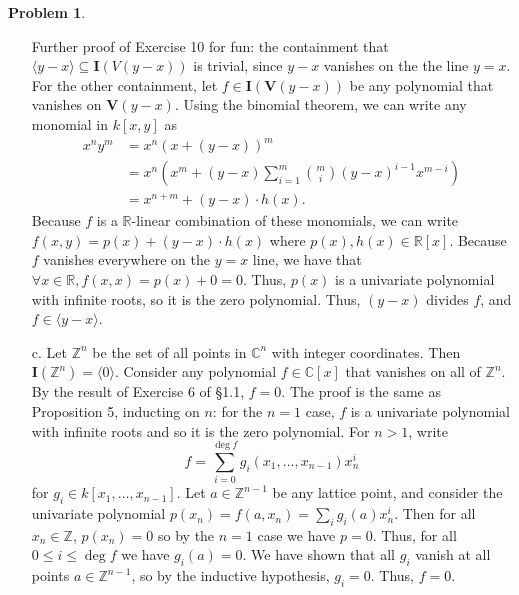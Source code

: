 \documentclass[12pt]{amsart}
\theoremstyle{definition}
\newtheorem{prob}{Problem}
\begin{document}
\begin{flushleft}
\begin{prob}
\begin{enumerate}
    Further proof of Exercise 10 for fun: the containment that $\langle y-x\rangle \subseteq \mathbf I(V(y-x))$ is trivial, since $y-x$ vanishes on the the line $y=x$. For the other containment, let $f \in \mathbf I(\mathbf V(y-x))$ be any polynomial that vanishes on $\mathbf V(y-x)$. Using the binomial theorem, we can write any monomial in $k[x,y]$ as \begin{align*}x^ny^m &= x^n(x+(y-x))^m
    \\ &= x^n\left(x^m +(y-x)\sum_{i=1}^m \binom{m}{i}(y-x)^{i-1}x^{m-i}\right)
    \\ &= x^{n+m} + (y-x)\cdot h(x).
    \end{align*}
    Because $f$ is a $\mathbb R$-linear combination of these monomials, we can write $f(x,y) = p(x)+(y-x)\cdot h(x)$ where $p(x), h(x) \in \mathbb R[x]$. Because $f$ vanishes everywhere on the $y=x$ line, we have that $\forall x \in \mathbb R, f(x,x)=p(x)+0=0$. Thus, $p(x)$ is a univariate polynomial with infinite roots, so it is the zero polynomial. Thus, $(y-x)$ divides $f$, and $f \in \langle y-x\rangle$.
    \item[c.] Let $\mathbb Z^n$ be the set of all points in $\mathbb C^n$ with integer coordinates. Then $\mathbf I(\mathbb Z^n) = \langle 0 \rangle$. Consider any polynomial $f \in \mathbb C[x]$ that vanishes on all of $\mathbb Z^n$. By the result of Exercise 6 of \S 1.1, $f = 0$. The proof is the same as Proposition 5, inducting on $n$: for the $n=1$ case, $f$ is a univariate polynomial with infinite roots and so it is the zero polynomial. For $n > 1$, write \[f = \sum_{i=0}^{\deg f} g_i(x_1, \dots, x_{n-1}) x_n^i\] for $g_i \in k[x_1,\dots,x_{n-1}]$.
    Let $a \in \mathbb Z^{n-1}$ be any lattice point, and consider the univariate polynomial $p(x_n)= f(a,x_n)= \sum_i g_i(a) x_n^i$. Then for all $x_n \in \mathbb Z$, $p(x_n) = 0$ so by the $n=1$ case we have $p = 0$. Thus, for all $0 \le i \le \deg f$ we have $g_i(a) = 0$. We have shown that all $g_i$ vanish at all points $a \in \mathbb Z^{n-1}$, so by the inductive hypothesis, $g_i = 0$. Thus, $f = 0$. 
\end{enumerate}
\end{prob}
\bigskip 



\end{flushleft}
\end{document}
